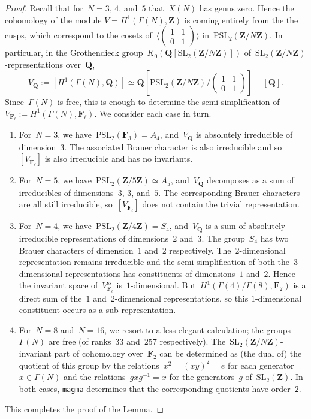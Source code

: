 \documentclass[10pt]{amsart}
\def\PSL{\mathrm{PSL}}
\def\sss{\mathrm{ss}}
\def\F{\mathbf{F}}
\def\Z{\mathbf{Z}}
\def\Q{\mathbf{Q}}
\theoremstyle{remark}
\numberwithin{equation}{subsection}
\def\SL{\mathrm{SL}}
\begin{document}
\begin{proof}
Recall that for~$N=3$, $4$, and~$5$ that~$X(N)$ has genus zero. Hence the cohomology of the module
$V =H^1(\Gamma(N),\Z)$
 is coming entirely from the the cusps, which correspond
to the cosets of~$\langle \left( \begin{matrix} 1 & 1 \\ 0 & 1 \end{matrix} \right) \rangle$
in~$\PSL_2(\Z/N \Z)$. In particular,  in the Grothendieck 
group~$K_0(\Q[\SL_2(\Z/N \Z)])$ of~$\SL_2(\Z/N\Z)$-representations over~$\Q$,
$$V_{\Q} :=  \left[ H^1(\Gamma(N),\Q)\right] \simeq \Q \left[\PSL_2(\Z/N\Z)/ \left( \begin{matrix} 1 & 1 \\ 0 & 1 \end{matrix} \right) \right] - [\Q].$$
Since~$\Gamma(N)$ is free, this is enough to determine the semi-simplification 
of~$V_{\F_{\ell}}:= H^1(\Gamma(N),\F_{\ell})$.
We consider each case in turn.
\begin{enumerate}
\item For~$N=3$, we have~$\PSL_2(\F_3) = A_4$, and~$V_{\Q}$
is absolutely irreducible of dimension~$3$.
The associated Brauer character is also irreducible
and so~$[V_{\F_{\ell}}]$ is also
 irreducible and has no invariants.
\item For~$N=5$, we have~$\PSL_2(\Z/5\Z) \simeq A_5$, and~$V_{\Q}$ decomposes
as a sum of irreducibles of dimensions~$3$, $3$, and~$5$.
The corresponding Brauer characters are all still irreducible, so~$[V_{\F_{\ell}}]$ 
does not contain the trivial representation.
 \item
 For~$N =4$, we have~$\PSL_2(\Z/4\Z) = S_4$,
 and~$V_{\Q}$ is a sum of absolutely irreducible representations of dimensions~$2$
 and~$3$. The group~$S_4$ has two Brauer characters of dimension~$1$ and~$2$ respectively.
 The~$2$-dimensional representation remains irreducible and the semi-simplification
 of both the~$3$-dimensional representations has constituents of dimensions~$1$ and~$2$.
 Hence the invariant space  of~$V^{\sss}_{\F_{\ell}}$ is~$1$-dimensional.
 But~$H^1(\Gamma(4)/\Gamma(8),\F_2)$ is a direct sum of the~$1$ and~$2$-dimensional
 representations, so this $1$-dimensional constituent occurs as a sub-representation.
\item 
For~$N=8$ and~$N=16$, we resort to a less elegant calculation; the groups~$\Gamma(N)$
are free (of ranks~$33$ and~$257$ respectively). The~$\SL_2(\Z/N\Z)$-invariant part of cohomology over~$\F_2$ can be determined as (the dual of) the quotient of this group by the 
relations~$x^2 = (x y)^2 = e$ for each generator~$x \in \Gamma(N)$ and the relations~$g x g^{-1} = x$ for the generators~$g$ of~$\SL_2(\Z)$. In both cases, \texttt{magma} determines that
the corresponding quotients have order~$2$.
\end{enumerate}
This completes the proof of the Lemma.
\end{proof}
\end{document}
